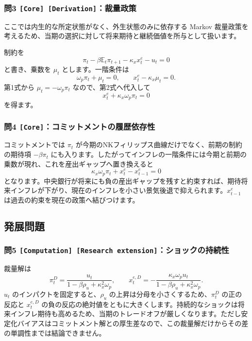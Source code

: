 \documentclass[
  japanese,
  lualatex,
  ja=standard,
  11pt,
  a4paper]{ltjsarticle}
\begin{document}
\subsubsection{\texorpdfstring{問3
\texttt{{[}Core{]}\ {[}Derivation{]}}：裁量政策}{問3 {[}Core{]} {[}Derivation{]}：裁量政策}}\label{ux554f3-core-derivationux88c1ux91cfux653fux7b56}

ここでは内生的な所定状態がなく、外生状態のみに依存する Markov
裁量政策を考えるため、当期の選択に対して将来期待と継続価値を所与として扱います。

制約を \[
\pi_t-\beta\mathbb E_t\pi_{t+1}-\kappa_xx_t^e-u_t=0
\] と書き、乗数を \(\mu_t\) とします。一階条件は \[
\omega_p\pi_t+\mu_t=0,
\qquad
x_t^e-\kappa_x\mu_t=0.
\] 第1式から \(\mu_t=-\omega_p\pi_t\) なので、第2式へ代入して \[
x_t^e+\kappa_x\omega_p\pi_t=0
\] を得ます。

\subsubsection{\texorpdfstring{問4
\texttt{{[}Core{]}}：コミットメントの履歴依存性}{問4 {[}Core{]}：コミットメントの履歴依存性}}\label{ux554f4-coreux30b3ux30dfux30c3ux30c8ux30e1ux30f3ux30c8ux306eux5c65ux6b74ux4f9dux5b58ux6027}

コミットメントでは \(\pi_t\)
が今期のNKフィリップス曲線だけでなく、前期の制約の期待項 \(-\beta\pi_t\)
にも入ります。したがってインフレの一階条件には今期と前期の乗数が現れ、これを産出ギャップへ置き換えると
\[
\kappa_x\omega_p\pi_t+x_t^e-x_{t-1}^e=0
\]
となります。中央銀行が将来にも負の産出ギャップを残すと約束すれば、期待将来インフレが下がり、現在のインフレを小さい景気後退で抑えられます。\(x_{t-1}^e\)
は過去の約束を現在の政策へ結びつけます。

\subsection{発展問題}\label{ux767aux5c55ux554fux984c-8}

\subsubsection{\texorpdfstring{問5
\texttt{{[}Computation{]}\ {[}Research\ extension{]}}：ショックの持続性}{問5 {[}Computation{]} {[}Research extension{]}：ショックの持続性}}\label{ux554f5-computation-research-extensionux30b7ux30e7ux30c3ux30afux306eux6301ux7d9aux6027}

裁量解は \[
\pi_t^D
=\frac{u_t}{1-\beta\rho_u+\kappa_x^2\omega_p},
\qquad
x_t^{e,D}
=-\frac{\kappa_x\omega_p u_t}
{1-\beta\rho_u+\kappa_x^2\omega_p}.
\] \(u_t\) のインパクトを固定すると、\(\rho_u\)
の上昇は分母を小さくするため、\(\pi_t^D\) の正の反応と \(x_t^{e,D}\)
の負の反応の絶対値をともに大きくします。持続的なショックは将来インフレ期待も高めるため、当期のトレードオフが厳しくなります。ただし安定化バイアスはコミットメント解との厚生差なので、この裁量解だけからその差の単調性までは結論できません。
\end{document}
